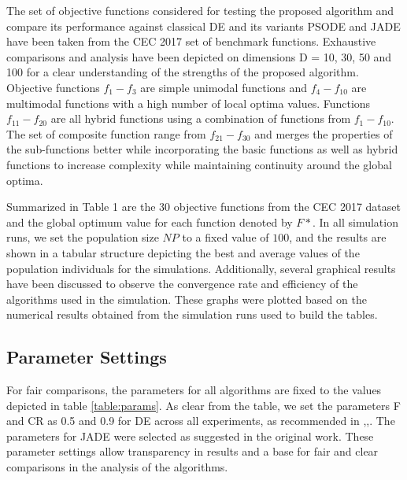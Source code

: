 \documentclass[a4paper,twoside]{article}
\begin{document}
The set of objective functions considered for testing the proposed algorithm and compare its performance against classical DE and its variants PSODE and JADE have been taken from the CEC 2017 set of benchmark functions. Exhaustive comparisons and analysis have been depicted on dimensions D = 10, 30, 50 and 100 for a clear understanding of the strengths of the proposed algorithm. Objective functions $f_1 - f_3$ are simple unimodal functions and $f_4 - f_{10}$ are multimodal functions with a high number of local optima values. Functions $f_{11} - f_{20}$ are all hybrid functions using a combination of functions from $f_1 - f_{10}$. The set of composite function range from $f_{21} - f_{30}$ and merges the properties of the sub-functions better while incorporating the basic functions as well as hybrid functions to increase complexity while maintaining continuity around the global optima.

Summarized in Table 1 are the 30 objective functions from the CEC 2017 dataset and the global optimum value for each function denoted by $F*$. In all simulation runs, we set the population size $NP$ to a fixed value of $100$, and the results are shown in a tabular structure depicting the best and average values of the population individuals for the simulations. Additionally, several graphical results have been discussed to observe the convergence rate and efficiency of the algorithms used in the simulation. These graphs were plotted based on the numerical results obtained from the simulation runs used to build the tables.

\subsection{Parameter Settings}


For fair comparisons, the parameters for all algorithms are fixed to the values depicted in table \ref{table:params}. As clear from the table, we set the parameters F and CR as 0.5 and 0.9 for DE across all experiments, as recommended in \cite{storn1995differential},\cite{Mezura-Montes},\cite{brest2006self}. The parameters for JADE were selected as suggested in the original work\cite{zhang2009jade}. These parameter settings allow transparency in results and a base for fair and clear comparisons in the analysis of the algorithms.



\end{document}
